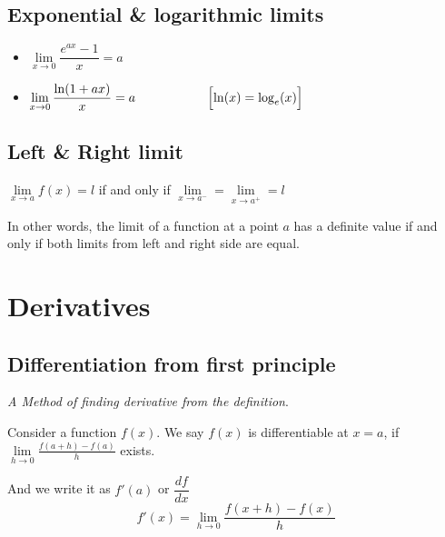 \documentclass{article}
\begin{document}
\subsection{Exponential \& logarithmic limits}
\begin{itemize}
  \item $\lim\limits_{x \to 0}\dfrac{e^{ax} - 1}{x} = a$
  \item $\lim\limits_{x \to 0}\dfrac{\ln(1 + ax)}{x} = a \hspace{2cm} \Bigl[\ln(x) = \log_e(x)\Bigr] $
\end{itemize}

\subsection{Left \& Right limit}
\par \hspace{.3cm} $\lim\limits_{x \to a}f(x) = l$\hspace{.3cm} if and only if \hspace{.2cm} $\lim\limits_{x \to a^-} = \lim\limits_{x \to a^+} = l$
\par In other words, the limit of a function at a point $a$ has a definite value if and only if both limits from left and right side are equal.

\maketitle
\section{Derivatives}
\subsection{Differentiation from first principle}

\par \hspace{.4cm}\textit{A Method of finding derivative from the definition}.\\
\par Consider a function $f(x)$. We say $f(x)$ is differentiable at $x=a$, if
\hspace{.15cm} $\lim\limits_{h \to 0}\frac{f(a + h) - f(a)}{h}$
\hspace{.15cm} exists.
\par And we write it as $f'(a)$ or $\dfrac{df}{dx}$\\
\[f'(x) = \lim\limits_{h \to 0}\frac{f(x + h) - f(x)}{h}\]
\end{document}
